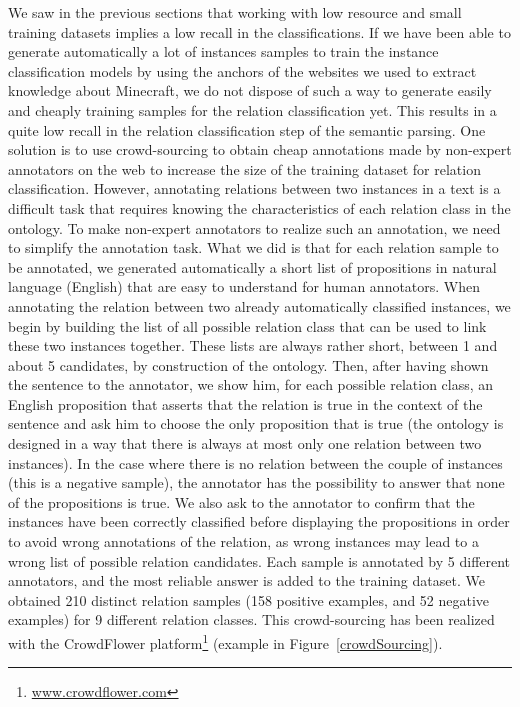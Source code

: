 \documentclass[12pt]{article}
\begin{document}
We saw in the previous sections that working with low resource and small training datasets implies a low recall in the classifications. If we have been able to generate automatically a lot of instances samples to train the instance classification models by using the anchors of the websites we used to extract knowledge about Minecraft, we do not dispose of such a way to generate easily and cheaply training samples for the relation classification yet. This results in a quite low recall in the relation classification step of the semantic parsing.
One solution is to use crowd-sourcing to obtain cheap annotations made by non-expert annotators on the web to increase the size of the training dataset for relation classification.
However, annotating relations between two instances in a text is a difficult task that requires knowing the characteristics of each relation class in the ontology. To make non-expert annotators to realize such an annotation, we need to simplify the annotation task.
What we did is that for each relation sample to be annotated, we generated automatically a short list of propositions in natural language (English) that are easy to understand for human annotators. When annotating the relation between two already automatically classified instances, we begin by building the list of all possible relation class that can be used to link these two instances together. These lists are always rather short, between 1 and about 5 candidates, by construction of the ontology. Then, after having shown the sentence to the annotator, we show him, for each possible relation class, an English proposition that asserts that the relation is true in the context of the sentence and ask him to choose the only proposition that is true (the ontology is designed in a way that there is always at most only one relation between two instances). In the case where there is no relation between the couple of instances (this is a negative sample), the annotator has the possibility to answer that none of the propositions is true. We also ask to the annotator to confirm that the instances have been correctly classified before displaying the propositions in order to avoid wrong annotations of the relation, as wrong instances may lead to a wrong list of possible relation candidates. Each sample is annotated by 5 different annotators, and the most reliable answer is added to the training dataset. We obtained 210 distinct relation samples (158 positive examples, and 52 negative examples) for 9 different relation classes.
This crowd-sourcing has been realized with the CrowdFlower platform\footnote{
\href{http://www.crowdflower.com/}{www.crowdflower.com}} (example in Figure~\ref{crowdSourcing}).
\end{document}
